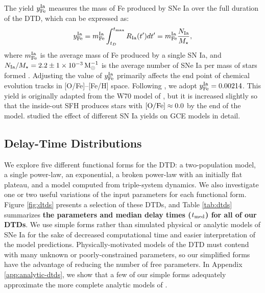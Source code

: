 \documentclass[twocolumn,twocolappendix,linenumbers]{aastex631}
\begin{document}
The yield $y_{\rm Fe}^{\rm Ia}$ measures the mass of Fe produced by SNe Ia over the full duration of the DTD, which can be expressed as:
\begin{equation}
    y_{\rm Fe}^{\rm Ia} = m_{\rm Fe}^{\rm Ia} \int_{t_D}^{t_{\rm max}} R_{\rm Ia}(t')dt' = m_{\rm Fe}^{\rm Ia} \frac{N_{\rm Ia}}{M_\star},
    \label{eq:dtd-integral}
\end{equation}
where $m_{\rm Fe}^{\rm Ia}$ is the average mass of Fe produced by a single SN Ia, and $N_{\rm Ia}/M_\star=2.2\pm1\times10^{-3}\,{\rm M}_\odot^{-1}$ is the average number of SNe Ia per mass of stars formed \citep{MaozMannucci2012-SNeIaReview}. Adjusting the value of $y_{\rm Fe}^{\rm Ia}$ primarily affects the end point of chemical evolution tracks in [O/Fe]--[Fe/H] space. Following , we adopt $y_{\rm Fe}^{\rm Ia}=0.00214$. This yield is originally adapted from the W70 model of \citet{Iwamoto1999-SNIaYields}, but it is increased slightly so that the inside-out SFH produces stars with ${\rm [O/Fe]}\approx 0.0$ by the end of the model. \citet{Palla2021-SNIaYield} studied the effect of different SN Ia yields on GCE models in detail.

\subsection{Delay-Time Distributions}
\label{sec:dtd-models}

We explore five different functional forms for the DTD: a two-population model, a single power-law, an exponential, a broken power-law with an initially flat plateau, and a model computed from triple-system dynamics. We also investigate one or two useful variations of the input parameters for each functional form. Figure \ref{fig:dtds} presents a selection of these DTDs, and Table \ref{tab:dtds} summarizes {\bf the parameters and median delay times ($t_{\rm med}$) for all of our DTDs}. We use simple forms rather than simulated physical or analytic models of SNe Ia for the sake of decreased computational time and easier interpretation of the model predictions. Physically-motivated models of the DTD must contend with many unknown or poorly-constrained parameters, so our simplified forms have the advantage of reducing the number of free parameters. In Appendix \ref{app:analytic-dtds}, we show that a few of our simple forms adequately approximate the more complete analytic models of \citet{Greggio2005-AnalyticalRates}. 
\end{document}
